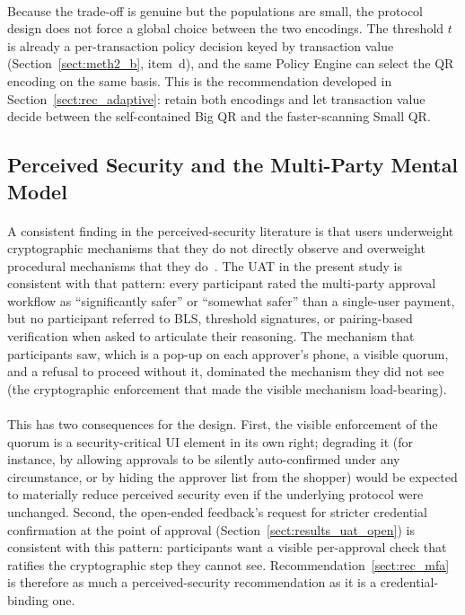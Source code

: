 \paragraph{}Because the trade-off is genuine but the populations are small, the protocol design does not force a global choice between the two encodings. The threshold $t$ is already a per-transaction policy decision keyed by transaction value (Section~\ref{sect:meth2_b}, item~d), and the same Policy Engine can select the QR encoding on the same basis. This is the recommendation developed in Section~\ref{sect:rec_adaptive}: retain both encodings and let transaction value decide between the self-contained Big QR and the faster-scanning Small QR.

\subsection{Perceived Security and the Multi-Party Mental Model}
\label{sect:disc_perceived}

\paragraph{}A consistent finding in the perceived-security literature is that users underweight cryptographic mechanisms that they do not directly observe and overweight procedural mechanisms that they do~\cite{krombholz2014}. The UAT in the present study is consistent with that pattern: every participant rated the multi-party approval workflow as ``significantly safer'' or ``somewhat safer'' than a single-user payment, but no participant referred to BLS, threshold signatures, or pairing-based verification when asked to articulate their reasoning. The mechanism that participants saw, which is a pop-up on each approver's phone, a visible quorum, and a refusal to proceed without it, dominated the mechanism they did not see (the cryptographic enforcement that made the visible mechanism load-bearing).

\paragraph{}This has two consequences for the design. First, the visible enforcement of the quorum is a security-critical UI element in its own right; degrading it (for instance, by allowing approvals to be silently auto-confirmed under any circumstance, or by hiding the approver list from the shopper) would be expected to materially reduce perceived security even if the underlying protocol were unchanged. Second, the open-ended feedback's request for stricter credential confirmation at the point of approval (Section~\ref{sect:results_uat_open}) is consistent with this pattern: participants want a visible per-approval check that ratifies the cryptographic step they cannot see. Recommendation~\ref{sect:rec_mfa} is therefore as much a perceived-security recommendation as it is a credential-binding one.


